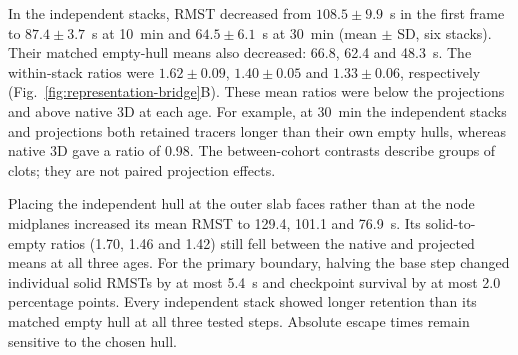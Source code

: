 In the independent stacks, RMST decreased from $108.5\pm9.9$~s in the first frame to $87.4\pm3.7$~s at 10~min and $64.5\pm6.1$~s at 30~min (mean $\pm$ SD, six stacks). Their matched empty-hull means also decreased: 66.8, 62.4 and 48.3~s. The within-stack ratios were $1.62\pm0.09$, $1.40\pm0.05$ and $1.33\pm0.06$, respectively (Fig.~\ref{fig:representation-bridge}B). These mean ratios were below the projections and above native 3D at each age. For example, at 30~min the independent stacks and projections both retained tracers longer than their own empty hulls, whereas native 3D gave a ratio of 0.98. The between-cohort contrasts describe groups of clots; they are not paired projection effects.

Placing the independent hull at the outer slab faces rather than at the node midplanes increased its mean RMST to 129.4, 101.1 and 76.9~s. Its solid-to-empty ratios (1.70, 1.46 and 1.42) still fell between the native and projected means at all three ages. For the primary boundary, halving the base step changed individual solid RMSTs by at most 5.4~s and checkpoint survival by at most 2.0 percentage points. Every independent stack showed longer retention than its matched empty hull at all three tested steps. Absolute escape times remain sensitive to the chosen hull.
